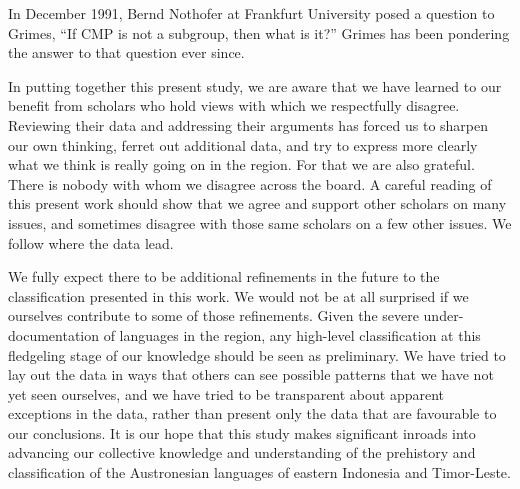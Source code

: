 In December 1991,
Bernd Nothofer at Frankfurt University posed a question to Grimes,
“If CMP is not a subgroup,
then what is it?” Grimes has been pondering the answer to that question ever since.

In putting together this present study,
we are aware that we have learned to our benefit from scholars who hold views with which we respectfully disagree.
Reviewing their data and addressing their arguments has forced us to sharpen our own thinking,
ferret out additional data,
and try to express more clearly what we think is really going on in the region.
For that we are also grateful.
There is nobody with whom we disagree across the board.
A careful reading of this present work should show that we agree and support other scholars on many issues,
and sometimes disagree with those same scholars on a few other issues.
We follow where the data lead.

We fully expect there to be additional refinements
in the future to the classification presented in this work.
We would not be at all surprised if we ourselves contribute to some of those refinements.
Given the severe under-documentation of languages in the region,
any high-level classification at this fledgeling stage of
our knowledge should be seen as preliminary.
We have tried to lay out the data in ways that others
can see possible patterns that we have not yet seen ourselves,
and we have tried to be transparent about apparent exceptions in the data,
rather than present only the data that are favourable to our conclusions.
It is our hope that this study makes significant inroads into advancing
our collective knowledge and understanding of the prehistory and
classification of the Austronesian languages of eastern Indonesia and Timor-Leste.


